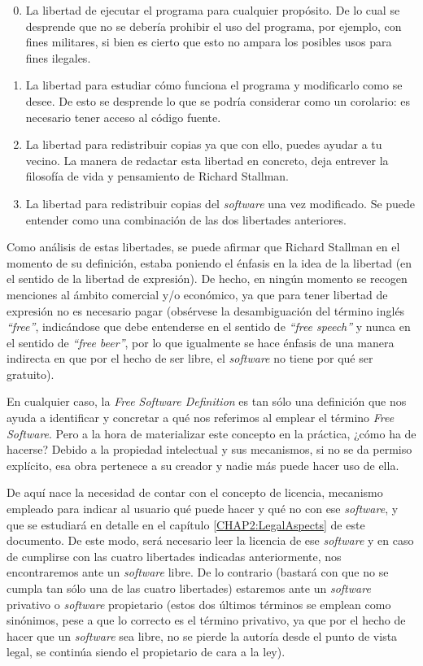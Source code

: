 \begin{enumerate}
  \setcounter{enumi}{-1}
  \item La libertad de ejecutar el programa para cualquier propósito. De lo
cual se desprende que no se debería prohibir el uso del programa, por ejemplo,
con fines militares, si bien es cierto que esto no ampara los posibles usos para
fines ilegales.
  \item La libertad para estudiar cómo funciona el programa y modificarlo como
se desee. De esto se desprende lo que se podría considerar como un corolario:
es necesario tener acceso al código fuente.
  \item La libertad para redistribuir copias ya que con ello, puedes ayudar a
tu vecino. La manera de redactar esta libertad en concreto, deja entrever la
filosofía de vida y pensamiento de Richard Stallman.
  \item La libertad para redistribuir copias del \textit{software} una vez
modificado. Se puede entender como una combinación de las dos libertades
anteriores.
\end{enumerate}

Como análisis de estas libertades, se puede afirmar que Richard Stallman en el
momento de su definición, estaba poniendo el énfasis en la idea de la libertad
(en el sentido de la libertad de expresión). De hecho, en ningún momento se
recogen menciones al ámbito comercial y/o económico, ya que para tener libertad
de expresión no es necesario pagar (obsérvese la desambiguación del término
inglés \textit{``free''}, indicándose que debe entenderse en el sentido de
\textit{``free speech''} y nunca en el sentido de \textit{``free beer''}, por lo
que igualmente se hace énfasis de una manera indirecta en que por el hecho de
ser libre, el \textit{software} no tiene por qué ser gratuito).

En cualquier caso, la \textit{Free Software Definition} es tan sólo una
definición que nos ayuda a identificar y concretar a qué nos referimos al
emplear el término \textit{Free Software}. Pero a la hora de materializar este
concepto en la práctica, ¿cómo ha de hacerse? Debido a la propiedad intelectual
y sus mecanismos, si no se da permiso explícito, esa obra pertenece a su creador
y nadie más puede hacer uso de ella.

De aquí nace la necesidad de contar con el concepto de licencia, mecanismo
empleado para indicar al usuario qué puede hacer y qué no con ese
\textit{software}, y que se estudiará en detalle en el capítulo
\ref{CHAP2:LegalAspects} de este documento. De este modo, será necesario
leer la licencia de ese \textit{software} y en caso de cumplirse con las cuatro
libertades indicadas anteriormente, nos encontraremos ante un \textit{software}
libre. De lo contrario (bastará con que no se cumpla tan sólo una de las cuatro
libertades) estaremos ante un \textit{software} privativo o \textit{software}
propietario (estos dos últimos términos se emplean como sinónimos, pese a que lo
correcto es el término privativo, ya que por el hecho de hacer que un
\textit{software} sea libre, no se pierde la autoría desde el punto de vista
legal, se continúa siendo el propietario de cara a la ley).

